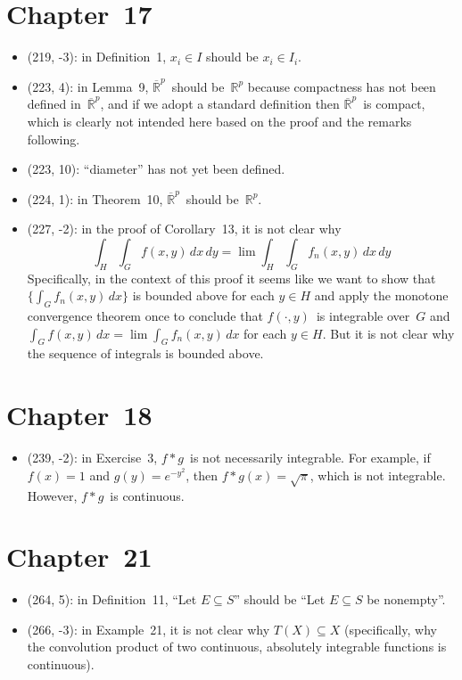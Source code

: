 \documentclass[letterpaper,12pt]{article}
\newcommand{\R}{\mathbb{R}}
\newcommand{\Rex}{\overline{\R}}
\newcommand{\conv}{\ast}
\renewcommand{\d}[1]{\,d\!{#1}}
\newcommand{\dx}{\d{x}}
\newcommand{\dy}{\d{y}}
\begin{document}
\section*{Chapter~17}
\begin{itemize}
\item (219, -3): in Definition~1, \(x_i\in I\) should be \(x_i\in I_i\).
\item (223, 4): in Lemma~9, \(\Rex^p\)~should be~\(\R^p\) because compactness has not been defined in~\(\Rex^p\), and if we adopt a standard definition then \(\Rex^p\)~is compact, which is clearly not intended here based on the proof and the remarks following.
\item (223, 10): ``diameter'' has not yet been defined.
\item (224, 1): in Theorem~10, \(\Rex^p\)~should be~\(\R^p\).
\item (227, -2): in the proof of Corollary~13, it is not clear why
\[\int_H\int_G f(x,y)\dx\dy=\lim\int_H\int_G f_n(x,y)\dx\dy\]
Specifically, in the context of this proof it seems like we want to show that \(\{\int_G f_n(x,y)\dx\}\) is bounded above for each \(y\in H\) and apply the monotone convergence theorem once to conclude that \(f(\cdot,y)\)~is integrable over~\(G\) and \(\int_G f(x,y)\dx=\lim\int_G f_n(x,y)\dx\) for each \(y\in H\). But it is not clear why the sequence of integrals is bounded above.
\end{itemize}

\section*{Chapter~18}
\begin{itemize}
\item (239, -2): in Exercise~3, \(f\conv g\)~is not necessarily integrable. For example, if \(f(x)=1\) and \(g(y)=e^{-y^2}\), then \(f\conv g(x)=\sqrt{\pi}\), which is not integrable. However, \(f\conv g\)~is continuous.
\end{itemize}

\section*{Chapter~21}
\begin{itemize}
\item (264, 5): in Definition~11, ``Let \(E\subseteq S\)'' should be ``Let \(E\subseteq S\) be nonempty''.
\item (266, -3): in Example~21, it is not clear why \(T(X)\subseteq X\) (specifically, why the convolution product of two continuous, absolutely integrable functions is continuous).
\end{itemize}
\end{document}
